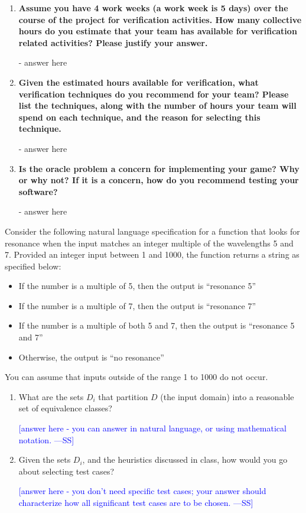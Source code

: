 \documentclass[12pt,fleqn]{examtst}
\newcommand{\authornote}[3]{\textcolor{#1}{[#3 ---#2]}}
\newcommand{\authornote}[3]{}
\newcommand{\wss}[1]{\authornote{blue}{SS}{#1}}
\begin{document}
\begin{enumerate}
\item \textbf{Assume you have 4 work weeks (a work week is 5 days) over the
    course of the project for verification activities.  How many collective
    hours do you estimate that your team has available for verification related
    activities?  Please justify your answer.}

  - answer here
  
\item \textbf{Given the estimated hours available for verification, what verification
    techniques do you recommend for your team?  Please list the techniques,
    along with the number of hours your team will spend on each technique, and
    the reason for selecting this technique.}

  - answer here
  
\item \textbf{Is the oracle problem a concern for implementing your game?  Why
    or why not?  If it is a concern, how do you recommend testing your software?}

  - answer here
    
\end{enumerate}


\newpage

 Consider the following natural language specification for a
function that looks for resonance when the input matches an integer multiple of
the wavelengths 5 and 7. Provided an integer input between 1 and 1000, the
function returns a string as specified below:

\begin{itemize}
\item If the number is a multiple of 5, then the output is “resonance 5”
\item If the number is a multiple of 7, then the output is “resonance 7”
\item If the number is a multiple of both 5 and 7, then the output is “resonance
  5 and 7”
\item Otherwise, the output is “no resonance”
\end{itemize}

You can assume that inputs outside of the range 1 to 1000 do not occur.

\begin{enumerate}
\item What are the sets $D_i$ that partition $D$ (the input domain) into a
  reasonable set of equivalence classes?

  \wss{answer here - you can answer in natural language, or using mathematical
    notation.}

\item Given the sets $D_i$, and the heuristics discussed in class, how would you
  go about selecting test cases?

  \wss{answer here - you don't need specific test cases; your answer should
    characterize how all significant test cases are to be chosen.}
  
\end{enumerate}
  
\end{document}
